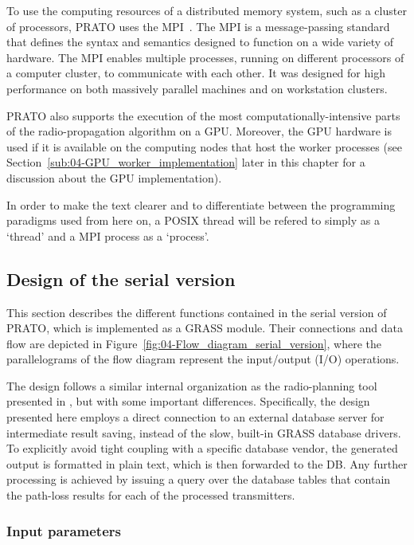 To use the computing resources of a distributed memory system, such
as a cluster of processors, PRATO uses the MPI~\cite{Gropp_Using_MPI:1999}.
The MPI is a message-passing standard that defines the syntax and
semantics designed to function on a wide variety of hardware. The
MPI enables multiple processes, running on different processors of
a computer cluster, to communicate with each other. It was designed
for high performance on both massively parallel machines and on workstation
clusters.

PRATO also supports the execution of the most computationally-intensive
parts of the radio-propagation algorithm on a GPU. Moreover, the GPU
hardware is used if it is available on the computing nodes that host
the worker processes (see Section~\ref{sub:04-GPU_worker_implementation}
later in this chapter for a discussion about the GPU implementation).

In order to make the text clearer and to differentiate between the
programming paradigms used from here on, a POSIX thread will be refered
to simply as a `thread' and a MPI process as a `process'.


\subsection{Design of the serial version}

This section describes the different functions contained in the serial
version of PRATO, which is implemented as a GRASS module. Their connections
and data flow are depicted in Figure~\ref{fig:04-Flow_diagram_serial_version},
where the parallelograms of the flow diagram represent the input/output
(I/O) operations. 

The design follows a similar internal organization as the radio-planning
tool presented in \cite{Ozimek_Open.source.radio.coverage.prediction:2010},
but with some important differences. Specifically, the design presented
here employs a direct connection to an external database server for
intermediate result saving, instead of the slow, built-in GRASS database
drivers. To explicitly avoid tight coupling with a specific database
vendor, the generated output is formatted in plain text, which is
then forwarded to the DB. Any further processing is achieved by issuing
a query over the database tables that contain the path-loss results
for each of the processed transmitters.


\subsubsection{Input parameters}

